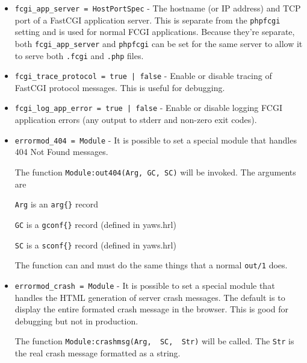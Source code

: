 \documentclass[11pt,oneside,english]{book}
\begin{document}
\begin{itemize}
\item       \verb+fcgi_app_server = HostPortSpec+ -
              The hostname (or IP address) and TCP port of a
              FastCGI application server. This is separate from the
              \verb+phpfcgi+ setting and is used for normal FCGI
              applications. Because they're separate, both
              \verb+fcgi_app_server+ and \verb+phpfcgi+ can be set for
              the same server to allow it to serve both \verb+.fcgi+
              and \verb+.php+ files.

\item       \verb+fcgi_trace_protocol = true | false+ -
              Enable or disable tracing of FastCGI protocol
              messages. This is useful for debugging.

\item       \verb+fcgi_log_app_error = true | false+ -
              Enable or disable logging FCGI application errors (any
              output to stderr and non-zero exit codes).

\item     \verb+errormod_404 = Module+ -
              It is possible to set a special module  that
              handles 404 Not Found messages.

              The function \verb+Module:out404(Arg, GC, SC)+ will
              be invoked. The arguments are

              \verb+Arg+ is an \verb+arg{}+ record

              \verb+GC+ is a \verb+gconf{}+ record (defined in
              yaws.hrl)

              \verb+SC+ is a \verb+sconf{}+ record (defined in
              yaws.hrl)

              The function can and must do the same things
              that a normal \verb+out/1+ does.

\item       \verb+errormod_crash = Module+ -
              It  is possible to set a special module that
              handles the HTML generation of server  crash
              messages.  The  default  is  to  display the
              entire  formated  crash   message   in   the
              browser.  This is good for debugging but not
              in production.

              The function \verb+Module:crashmsg(Arg,  SC,  Str)+
              will  be  called.  The \verb+Str+ is the real crash
              message formatted as a string.


\end{itemize}
\end{document}
